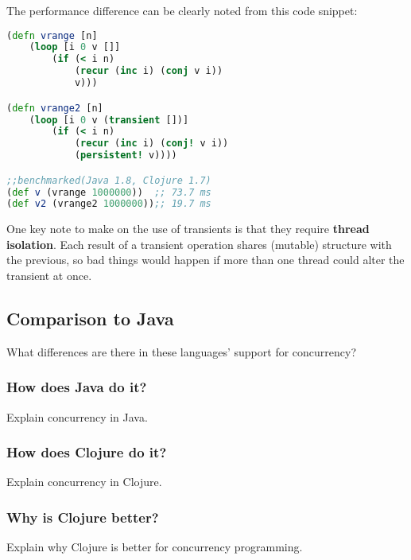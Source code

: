     The performance difference can be clearly noted from this code snippet:
	\begin{lstlisting}[language=clojure]
(defn vrange [n]
	(loop [i 0 v []]
		(if (< i n)
			(recur (inc i) (conj v i))
			v)))

(defn vrange2 [n]
	(loop [i 0 v (transient [])]
		(if (< i n)
			(recur (inc i) (conj! v i))
			(persistent! v))))

;;benchmarked(Java 1.8, Clojure 1.7)
(def v (vrange 1000000))  ;; 73.7 ms
(def v2 (vrange2 1000000));; 19.7 ms
	\end{lstlisting}
    
    One key note to make on the use of transients is that they require \textbf{thread isolation}. Each result of a transient operation shares (mutable) structure with the previous, so bad things would happen if more than one thread could alter the transient at once. \cite{website:clojure-lang-reference}

\subsection{Comparison to Java}

    What differences are there in these languages' support for concurrency?

\subsubsection{How does Java do it?}

    Explain concurrency in Java.

\subsubsection{How does Clojure do it?}

    Explain concurrency in Clojure.

\subsubsection{Why is Clojure better?}

    Explain why Clojure is better for concurrency programming.
